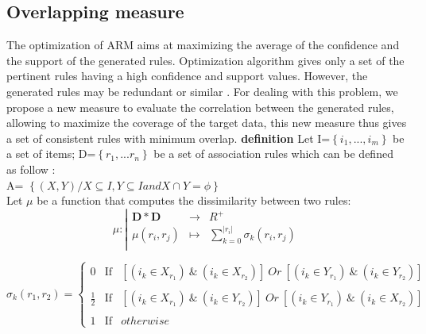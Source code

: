 \documentclass[preprint,12pt]{elsarticle}
\begin{document}
\subsection{Overlapping measure}
The optimization of ARM aims at maximizing the
average of the confidence and the support of the generated
rules. Optimization algorithm gives only a set of the pertinent
rules having a high confidence and support values. However, the
generated rules may be redundant or similar \cite{27}. For dealing with this
problem, we propose a new measure to evaluate the correlation
between the generated rules, allowing to maximize the coverage of
the target data, this new measure thus gives a set of consistent rules with minimum overlap.
\textbf{definition}
Let I=$\left\{i_{1},...,i_{m}\right\}$ be a set of items; D=$\left\{r_{1},...r_{n}\right\}$ be a set of association rules which can be defined as follow :  \\
A= $\left\{ (X,Y) / X  \subseteq  I, Y   \subseteq  I and X  \cap  Y =  \phi   \right\}$ \\
Let $\mu$ be a function that computes the dissimilarity between two rules:
\begin{displaymath}
\mu :
\left|
  \begin{array}{rcl}
    \mathbf{D*D} & \longrightarrow & {R^{+}} \\
    \mu (r_{i},r_{j}) & \longmapsto & \sum_{k=0}^{\left|r_i\right|}{\sigma_{k}{(r_{i},r_{j})}} \\
  \end{array}
\right.
\end{displaymath}

\begin{displaymath}
\sigma_{k}{(r_1,r_2)} =
\left\lbrace
\begin{array}{ccc}
0           & \mbox{If} &  [(i_{k} \in X_{r_1} )~\&~(i_{k} \in X_{r_2})]~Or~[(i_{k} \in Y_{r_1} ) ~\&~(i_{k} \in Y_{r_2})]  \\ \\
\frac{1}{2} & \mbox{If} &  [(i_{k} \in X_{r_1} )~\&~(i_{k} \in Y_{r_2})]~Or~[(i_{k} \in Y_{r_1} )~\&~(i_{k} \in X_{r_2})]\\\\
1           & \mbox{If} & otherwise
\end{array}\right.
\end{displaymath}
\end{document}
